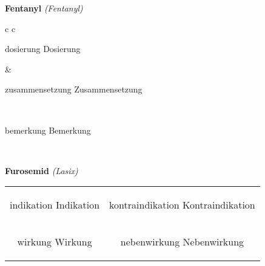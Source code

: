 \documentclass[12pt]{beamer}
\begin{document}
\begin{frame}{
    \textbf{Fentanyl}
    \textit{(Fentanyl)}
}
    \begin{tabular}{c c}
        \begin{beamercolorbox}[wd=\boxwidth\textwidth,ht=\boxheight\textheight,sep=1em]{dosierung}
        Dosierung
        \end{beamercolorbox} & 
        \begin{beamercolorbox}[wd=\boxwidth\textwidth,ht=\boxheight\textheight,sep=1em]{zusammensetzung}
        Zusammensetzung
        \end{beamercolorbox} \\
        \begin{beamercolorbox}[wd=\textwidth,ht=\boxheight\textheight,sep=1em]{bemerkung}
        Bemerkung
        \end{beamercolorbox} \\
    \end{tabular}
\end{frame}

\begin{frame}{
    \textbf{Furosemid}
    \textit{(Lasix)}
}
    \begin{tabular}{c c}
        \begin{beamercolorbox}[wd=\boxwidth\textwidth,ht=\boxheight\textheight,sep=1em]{indikation}
        Indikation
        \end{beamercolorbox} & 
        \begin{beamercolorbox}[wd=\boxwidth\textwidth,ht=\boxheight\textheight,sep=1em]{kontraindikation}
        Kontraindikation 
        \end{beamercolorbox} \\
        \begin{beamercolorbox}[wd=\boxwidth\textwidth,ht=\boxheight\textheight,sep=1em]{wirkung}
        Wirkung
        \end{beamercolorbox} & 
        \begin{beamercolorbox}[wd=\boxwidth\textwidth,ht=\boxheight\textheight,sep=1em]{nebenwirkung}
        Nebenwirkung
        \end{beamercolorbox} \\
    \end{tabular}
\end{frame}
\end{document}
